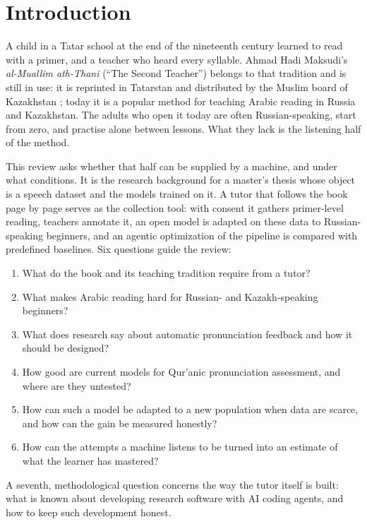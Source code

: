\documentclass[a4paper,14pt]{extarticle}
\begin{document}
\section{Introduction}

A child in a Tatar school at the end of the nineteenth century learned to read with a primer, and a
teacher who heard every syllable. Ahmad Hadi Maksudi's \emph{al-Muallim ath-Thani} (``The Second Teacher'')
belongs to that tradition and is still in use: it is reprinted in Tatarstan and distributed by the
Muslim board of Kazakhstan \cite{SRC-020,SRC-040}; today it is a popular method for teaching Arabic reading in
Russia and Kazakhstan. The adults who open it today are often
Russian-speaking, start from zero, and practise alone between lessons. What they lack is the listening
half of the method.

This review asks whether that half can be supplied by a machine, and under what conditions. It is the
research background for a master's thesis whose object is a speech dataset and the models trained on it. A tutor that follows the
book page by page serves as the collection tool: with consent it gathers primer-level reading, teachers
annotate it, an open model is adapted on these data to Russian-speaking beginners, and an agentic optimization of the pipeline is compared with predefined baselines. Six questions guide the review:

\begin{enumerate}[label=\textbf{Q\arabic*.}]
  \item What do the book and its teaching tradition require from a tutor?
  \item What makes Arabic reading hard for Russian- and Kazakh-speaking beginners?
  \item What does research say about automatic pronunciation feedback and how it should be designed?
  \item How good are current models for Qur'anic pronunciation assessment, and where are they untested?
  \item How can such a model be adapted to a new population when data are scarce, and how can the gain
    be measured honestly?
  \item How can the attempts a machine listens to be turned into an estimate of what the learner has mastered?
\end{enumerate}

A seventh, methodological question concerns the way the tutor itself is built: what is known about
developing research software with AI coding agents, and how to keep such development honest.
\end{document}
